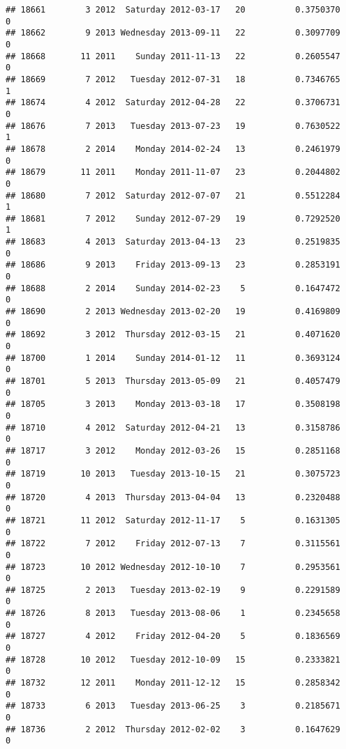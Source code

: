\documentclass[
]{article}
\begin{document}
\begin{verbatim}
## 18661        3 2012  Saturday 2012-03-17   20          0.3750370             0
## 18662        9 2013 Wednesday 2013-09-11   22          0.3097709             0
## 18668       11 2011    Sunday 2011-11-13   22          0.2605547             0
## 18669        7 2012   Tuesday 2012-07-31   18          0.7346765             1
## 18674        4 2012  Saturday 2012-04-28   22          0.3706731             0
## 18676        7 2013   Tuesday 2013-07-23   19          0.7630522             1
## 18678        2 2014    Monday 2014-02-24   13          0.2461979             0
## 18679       11 2011    Monday 2011-11-07   23          0.2044802             0
## 18680        7 2012  Saturday 2012-07-07   21          0.5512284             1
## 18681        7 2012    Sunday 2012-07-29   19          0.7292520             1
## 18683        4 2013  Saturday 2013-04-13   23          0.2519835             0
## 18686        9 2013    Friday 2013-09-13   23          0.2853191             0
## 18688        2 2014    Sunday 2014-02-23    5          0.1647472             0
## 18690        2 2013 Wednesday 2013-02-20   19          0.4169809             0
## 18692        3 2012  Thursday 2012-03-15   21          0.4071620             0
## 18700        1 2014    Sunday 2014-01-12   11          0.3693124             0
## 18701        5 2013  Thursday 2013-05-09   21          0.4057479             0
## 18705        3 2013    Monday 2013-03-18   17          0.3508198             0
## 18710        4 2012  Saturday 2012-04-21   13          0.3158786             0
## 18717        3 2012    Monday 2012-03-26   15          0.2851168             0
## 18719       10 2013   Tuesday 2013-10-15   21          0.3075723             0
## 18720        4 2013  Thursday 2013-04-04   13          0.2320488             0
## 18721       11 2012  Saturday 2012-11-17    5          0.1631305             0
## 18722        7 2012    Friday 2012-07-13    7          0.3115561             0
## 18723       10 2012 Wednesday 2012-10-10    7          0.2953561             0
## 18725        2 2013   Tuesday 2013-02-19    9          0.2291589             0
## 18726        8 2013   Tuesday 2013-08-06    1          0.2345658             0
## 18727        4 2012    Friday 2012-04-20    5          0.1836569             0
## 18728       10 2012   Tuesday 2012-10-09   15          0.2333821             0
## 18732       12 2011    Monday 2011-12-12   15          0.2858342             0
## 18733        6 2013   Tuesday 2013-06-25    3          0.2185671             0
## 18736        2 2012  Thursday 2012-02-02    3          0.1647629             0

\end{verbatim}
\end{document}
